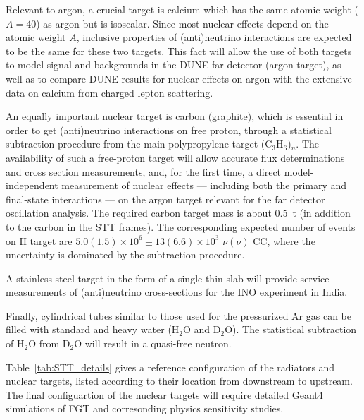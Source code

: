 
Relevant to argon, a crucial target is calcium which has the same
atomic weight ($A=40$) as argon but is isoscalar.  Since most nuclear
effects depend on the atomic weight $A$, inclusive properties of
(anti)neutrino interactions are expected to be the same for these two
targets.  This fact will allow the use of both targets to model
signal and backgrounds in the DUNE far detector (argon target), as
well as to compare DUNE results for nuclear effects on argon with the
extensive data on calcium from charged lepton scattering.


An equally important nuclear target is carbon (graphite), which is
essential in order to get (anti)neutrino interactions on free proton,
through a statistical subtraction procedure from the main
polypropylene target (C$_3$H$_6$)$_n$.  The availability of such a
free-proton target will allow accurate flux determinations and cross
section measurements, and, for the first time, a direct
model-independent measurement of nuclear effects --- including both
the primary and final-state interactions --- on the argon target
relevant for the far detector oscillation analysis. The required
carbon target mass is about 0.5~t (in addition to the carbon in the
STT frames). The corresponding expected number of events on H target
are $5.0 (1.5) \times 10^6 \pm 13(6.6) \times 10^3$ $\nu(\bar \nu)$
CC, where the uncertainty is dominated by the subtraction procedure.

A stainless steel target in the form of a single thin slab will
provide service measurements of (anti)neutrino cross-sections for the
INO experiment in India.

Finally, cylindrical tubes similar to those used for the pressurized Ar gas can
be filled with standard and heavy water (H$_2$O and D$_2$O). The
statistical subtraction of H$_2$O from D$_2$O will result in a
quasi-free neutron.

Table~\ref{tab:STT_details} gives a reference configuration of the
radiators and nuclear targets, listed according to their location from
downstream to upstream.  The final configuartion of the nuclear
targets will require detailed Geant4 simulations of FGT and
corresonding physics sensitivity studies.


